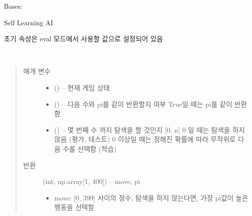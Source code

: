 \documentclass[letterpaper,10pt,english]{sphinxmanual}
\begin{document}
\begin{fulllineitems}
\label{\detokenize{agents.self_learning:agents.self_learning.agent.Agent}}
Bases: {\hyperref[\detokenize{agents:agents.BaseAgent}]{}}

Self Learning AI

초기 속성은 eval 모드에서 사용할 값으로 설정되어 있음

\begin{fulllineitems}
\label{\detokenize{agents.self_learning:agents.self_learning.agent.Agent.act}}~\begin{quote}\begin{description}
\item[{매개 변수}] \leavevmode\begin{itemize}
\item {} 
 ({\hyperref[\detokenize{scripts:scripts.run_game.State}]{}}) -- 현재 게임 상태

\item {} 
 () -- 다음 수와 pi를 같이 반환할지 여부
True일 때는 pi를 같이 반환함

\item {} 
 () -- 몇 번째 수 까지 탐색을 할 것인지 {[}0, n{]}
0 일 때는 탐색을 하지 않음 (평가, 테스트)
0 이상일 때는 정해진 확률에 따라 무작위로 다음 수를 선택함 (학습)

\end{itemize}

\item[{반환}] \leavevmode

(int, np.array{[}1, 400{]}) -- move, pi
\begin{itemize}
\item {} 
move: {[}0, 399{]} 사이의 정수, 탐색을 하지 않는다면, 가장 pi값이 높은 행동을 선택함


\end{itemize}
\end{description}
\end{quote}
\end{fulllineitems}
\end{fulllineitems}
\end{document}
